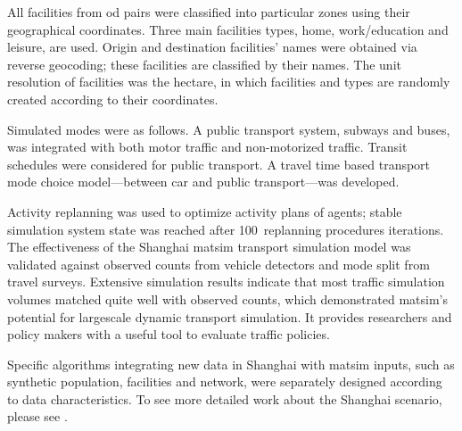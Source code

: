 All facilities from \gls{od} pairs were classified into particular zones using their geographical coordinates. Three main facilities types, home, work/education and leisure, are used. Origin and destination facilities' names were obtained via reverse \gls{geocoding}; these facilities are classified by their names. The unit resolution of facilities was the hectare, in which facilities and types are randomly created according to their coordinates.

Simulated modes were as follows. A public transport system, subways and buses, was integrated with both motor traffic and non-motorized traffic. Transit schedules were considered for public transport. A travel time based transport mode choice model---between car and public transport---was developed. %

Activity replanning was used to optimize activity plans of agents; stable simulation system state was reached after 100\, replanning procedures iterations. The effectiveness of the Shanghai \gls{matsim} transport simulation model was validated against observed counts from vehicle detectors and mode split from travel surveys. Extensive simulation results indicate that most traffic simulation volumes matched quite well with observed counts, which demonstrated \gls{matsim}'s potential for \gls{largescale} dynamic transport simulation. It provides researchers and policy makers with a useful tool to evaluate traffic policies. 

Specific algorithms integrating new data in Shanghai with \gls{matsim} inputs, such as synthetic population, facilities and network, were separately designed according to data characteristics. To see more detailed work about the Shanghai scenario, please see \citet[][]{ZhangLEtAl_TRR_2014}.


